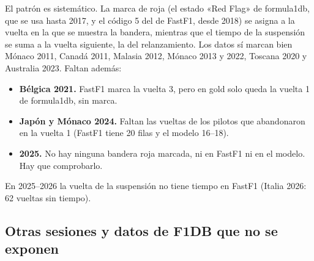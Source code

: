El patrón es sistemático. La marca de roja (el estado «Red Flag» de formula1db, que se usa hasta 2017, y el código 5 del  de FastF1, desde 2018) se asigna a la vuelta en la que se muestra la bandera, mientras que el tiempo de la suspensión se suma a la vuelta siguiente, la del relanzamiento. Los datos sí marcan bien Mónaco 2011, Canadá 2011, Malasia 2012, Mónaco 2013 y 2022, Toscana 2020 y Australia 2023. Faltan además:

\begin{itemize}
\item \textbf{Bélgica 2021.} FastF1 marca la vuelta 3, pero en gold solo queda la vuelta 1 de formula1db, sin marca.
\item \textbf{Japón y Mónaco 2024.} Faltan las vueltas de los pilotos que abandonaron en la vuelta 1 (FastF1 tiene 20 filas y el modelo 16–18).
\item \textbf{2025.} No hay ninguna bandera roja marcada, ni en FastF1 ni en el modelo. Hay que comprobarlo.
\end{itemize}

En 2025–2026 la vuelta de la suspensión no tiene tiempo en FastF1 (Italia 2026: 62 vueltas sin tiempo).

\subsection{Otras sesiones y datos de F1DB que no se exponen}

